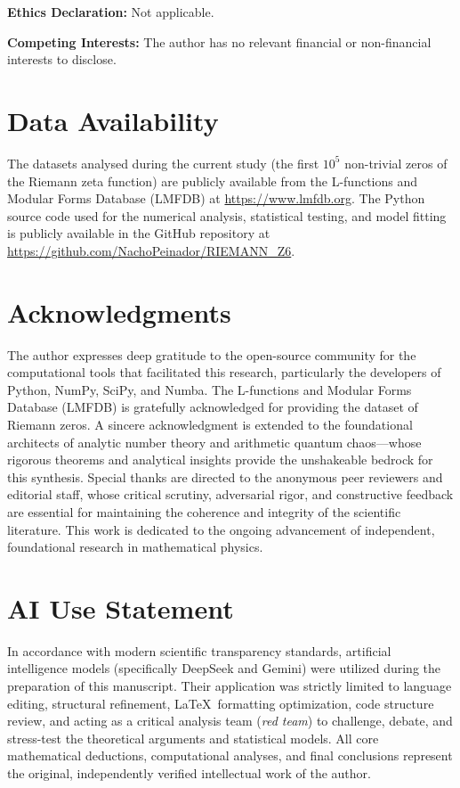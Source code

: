 \documentclass[12pt,a4paper]{article}
\theoremstyle{plain}
\theoremstyle{definition}
\theoremstyle{remark}
\begin{document}
\vspace{0.5em}
\noindent\textbf{Ethics Declaration:} Not applicable.

\vspace{0.5em}
\noindent\textbf{Competing Interests:} The author has no relevant financial or non-financial interests to disclose.

\section*{Data Availability}
The datasets analysed during the current study (the first \(10^5\) non-trivial zeros of the Riemann zeta function) are publicly available from the L-functions and Modular Forms Database (LMFDB) at \url{https://www.lmfdb.org}. The Python source code used for the numerical analysis, statistical testing, and model fitting is publicly available in the GitHub repository at \url{https://github.com/NachoPeinador/RIEMANN_Z6}.

\section*{Acknowledgments}
The author expresses deep gratitude to the open-source community for the computational tools that facilitated this research, particularly the developers of Python, NumPy, SciPy, and Numba. The L-functions and Modular Forms Database (LMFDB) is gratefully acknowledged for providing the dataset of Riemann zeros. A sincere acknowledgment is extended to the foundational architects of analytic number theory and arithmetic quantum chaos---whose rigorous theorems and analytical insights provide the unshakeable bedrock for this synthesis. Special thanks are directed to the anonymous peer reviewers and editorial staff, whose critical scrutiny, adversarial rigor, and constructive feedback are essential for maintaining the coherence and integrity of the scientific literature. This work is dedicated to the ongoing advancement of independent, foundational research in mathematical physics.

\section*{AI Use Statement}
In accordance with modern scientific transparency standards, artificial intelligence models (specifically DeepSeek and Gemini) were utilized during the preparation of this manuscript. Their application was strictly limited to language editing, structural refinement, \LaTeX\ formatting optimization, code structure review, and acting as a critical analysis team (\textit{red team}) to challenge, debate, and stress-test the theoretical arguments and statistical models. All core mathematical deductions, computational analyses, and final conclusions represent the original, independently verified intellectual work of the author.
\end{document}
